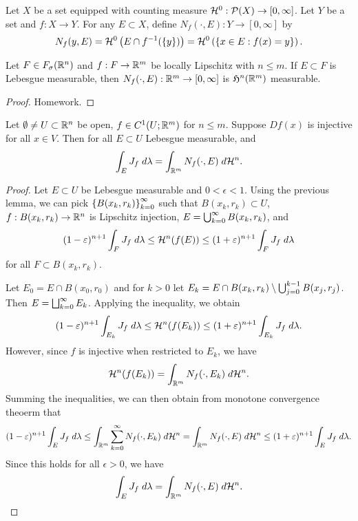 \documentclass[a4paper]{article}
\begin{document}
\begin{defi}
Let $X$ be a set equipped with counting measure 
$\mathcal{H}^0 : \mathcal{P}(X) \to [0, \infty]$. Let $Y$ be a set 
and $f: X \to Y$. For any $E \subset X$, define
$N_f (\cdot, E) : Y \to [0, \infty]$ by 
\[
N_f(y, E) = \mathcal{H}^0 \left( E \cap f^{-1} (\{y\}) \right) 
= \mathcal{H}^0 \left( \left\{ x \in E: f(x) = y \right\} \right).
\]
\end{defi}

\begin{thm}
Let $F \in F_\sigma(\mathbb{R}^n)$ and $f: F \to \mathbb{R}^m$ be locally 
Lipschitz with $n \leq m$. If $E \subset F$ is Lebesgue 
measurable, then $N_f(\cdot, E) : \mathbb{R}^m \to [0, \infty]$
is $\mathfrak{H}^n(\mathbb{R}^m)$ measurable.
\end{thm}

\begin{proof}
Homework.
\end{proof}

\begin{lemma}
Let $\emptyset \neq U \subset \mathbb{R}^n$ be open, $f \in C^1 
(U ; \mathbb{R}^m)$ for $n \leq m$. Suppose $Df(x)$ is injective
for all $x \in V$. Then for all $E \subset U$ Lebesgue 
measurable, and 
\[
\int_E J_f \; d \lambda = \int_{\mathbb{R}^m} N_f (\cdot, E) \; d \mathcal{H}^n.
\]
\end{lemma}

\begin{proof}
Let $E \subset U$ be Lebesgue measurable and $0 < \epsilon < 1$.
Using the previous lemma, we can pick $\left\{ B(x_k, r_k) \right\}_{k=0}^\infty$
such that $B(x_k, r_k) \subset U$, $f : B(x_k, r_k) \to \mathbb{R}^n$
is Lipschitz injection, $E = \bigcup_{k=0}^\infty B(x_k, r_k)$, and 
\[
(1 - \varepsilon)^{n+1} \int_F J_f \; d \lambda
\leq \mathcal{H}^n (f(E))
\leq (1 + \varepsilon)^{n+1} \int_F J_f \; d \lambda
\]
for all $F \subset B(x_k, r_k)$.

Let $E_0 = E \cap B(x_0, r_0)$ and for $k > 0$ let 
$E_k = E \cap B(x_k, r_k) \setminus \bigcup_{j=0}^{k-1} B(x_j, r_j)$.
Then $E = \bigsqcup_{k=0}^\infty E_k$. Applying the inequality, we obtain 
\[
(1 - \varepsilon)^{n+1} \int_{E_k} J_f \; d \lambda 
\leq \mathcal{H}^n (f(E_k)) 
\leq (1 + \varepsilon)^{n+1} \int_{E_k} J_f \; d \lambda.
\]
However, since $f$ is injective when restricted to $E_k$,
we have 
\[
\mathcal{H}^n (f(E_k)) = \int_{\mathbb{R}^m} N_f(\cdot, E_k) \; d \mathcal{H}^n.
\]
Summing the inequalities, we can then obtain from monotone
convergence theoerm that 
\[
(1 - \varepsilon)^{n+1} \int_E J_f \; d \lambda
\leq \int_{\mathbb{R}^m} \sum_{k=0}^\infty N_f(\cdot, E_k) \; d \mathcal{H}^n 
= \int_{\mathbb{R}^m} N_f(\cdot, E) \; d \mathcal{H}^n
\leq (1 + \varepsilon)^{n+1} \int_E J_f \; d \lambda.
\]
Since this holds for all $\epsilon > 0$, we have 
\[
\int_E J_f \; d \lambda = \int_{\mathbb{R}^m} N_f(\cdot, E) \; d \mathcal{H}^n.
\]
\end{proof}
\end{document}
